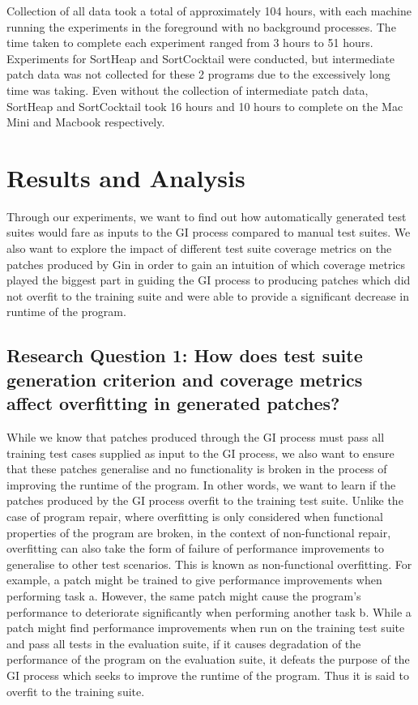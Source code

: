 \documentclass[titlepage]{article}
\begin{document}
Collection of all data took a total of approximately 104 hours, with each machine running the experiments in the foreground with no background processes. The time taken to complete each experiment ranged from 3 hours to 51 hours. Experiments for SortHeap and SortCocktail were conducted, but intermediate patch data was not collected for these 2 programs due to the excessively long time was taking. Even without the collection of intermediate patch data, SortHeap and SortCocktail took 16 hours and 10 hours to complete on the Mac Mini and Macbook respectively.


\section{Results and Analysis}
Through our experiments, we want to find out how automatically generated test suites would fare as inputs to the GI process compared to manual test suites. We also want to explore the impact of different test suite coverage metrics on the patches produced by Gin in order to gain an intuition of which coverage metrics played the biggest part in guiding the GI process to producing patches which did not overfit to the training suite and were able to provide a significant decrease in runtime of the program.

\subsection{Research Question 1: How does test suite generation criterion and coverage metrics affect overfitting in generated patches?}
While we know that patches produced through the GI process must pass all training test cases supplied as input to the GI process, we also want to ensure that these patches generalise and no functionality is broken in the process of improving the runtime of the program. In other words, we want to learn if the patches produced by the GI process overfit to the training test suite. Unlike the case of program repair, where overfitting is only considered when functional properties of the program are broken, in the context of non-functional repair, overfitting can also take the form of failure of performance improvements to generalise to other test scenarios. This is known as non-functional overfitting. For example, a patch might be trained to give performance improvements when performing task a. However, the same patch might cause the program’s performance to deteriorate significantly when performing another task b. While a patch might find performance improvements when run on the training test suite and pass all tests in the evaluation suite, if it causes degradation of the performance of the program on the evaluation suite, it defeats the purpose of the GI process which seeks to improve the runtime of the program. Thus it is said to overfit to the training suite.
\end{document}
